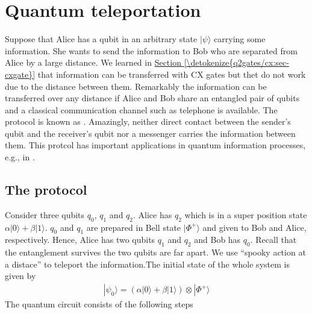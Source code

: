 \documentclass[letterpaper,10pt,english]{jupyterBook}
\begin{document}
\section{Quantum teleportation}
\label{\detokenize{algorithms/teleportation:quantum-teleportation}}\label{\detokenize{algorithms/teleportation:sec-teleportation}}\label{\detokenize{algorithms/teleportation::doc}}
\sphinxAtStartPar
Suppose that Alice has a qubit in an arbitrary state \(|\psi\rangle\) carrying some information.  She wants to send the information to Bob who are separated from Alice by a large distance.  We learned in \hyperref[\detokenize{q2gates/cx:sec-cxgate}]{Section \ref{\detokenize{q2gates/cx:sec-cxgate}}} that information can be transferred with CX gates but thet do not work due to the distance between them. Remarkably the information can be transferred over any distance if Alice and Bob share an entangled pair of qubits and a classical communication channel such as telephone is available.     The protocol is known as  .  Amazingly, neither direct contact between the sender’s qubit and the receiver’s qubit nor a messenger carries the information between them.  This protcol has important applications in quantum information processes, e.g.,  in .


\subsection{The protocol}
\label{\detokenize{algorithms/teleportation:the-protocol}}
\sphinxAtStartPar
Consider three qubits \(q_0\), \(q_1\) and \(q_2\). Alice has \(q_2\) which is in a super position state \(\alpha |0\rangle + \beta |1\rangle\).  \(q_0\) and \(q_1\) are prepared in Bell state \(|\Phi^{+}\rangle\) and given to Bob and Alice, respectively.  Hence, Alice has two qubits \(q_1\) and \(q_2\) and Bob has \(q_0\).  Recall that the entanglement survives the two qubits are far apart.  We use “spooky action at a distace” to teleport the information.The initial state of the whole system is given by
\begin{equation*}
\begin{split}
|\psi_0\rangle = \left( \alpha |0\rangle + \beta |1\rangle\right) \otimes |\Phi^{+}\rangle
\end{split}
\end{equation*}
\sphinxAtStartPar
The quantum circuit consists of the following steps
\end{document}
